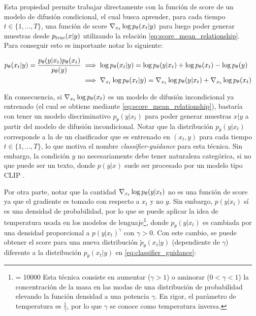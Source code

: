 Esta propiedad permite trabajar directamente con la función de score de un modelo de difusión condicional, el cual busca aprender, para cada tiempo $t\in\{1,\ldots,T\}$, una función de score $\nabla_{x_t} \log p_\theta(x_t|y)$ para luego poder generar muestras desde $p_{\operatorname{true}}(x|y)$ utilizando la relación \eqref{eq:score_mean_relationship}. Para conseguir esto es importante notar lo siguiente:

\begin{align}
    p_\theta(x_t|y) = \frac{p_\theta(y|x_t)p_\theta(x_t)}{p_\theta(y)} &\implies \log p_\theta(x_t|y) = \log p_\theta(y|x_t) + \log p_\theta(x_t) - \log p_\theta(y)\nonumber\\
    &\implies \nabla_{x_t} \log p_\theta(x_t|y) = \nabla_{x_t} \log p_\theta(y|x_t) + \nabla_{x_t} \log p_\theta(x_t)\label{eq:classifier_guidance}
\end{align}

En consecuencia, si $\nabla_{x_t} \log p_\theta(x_t)$ es un modelo de difusión incondicional ya entrenado (el cual se obtiene mediante \eqref{eq:score_mean_relationship}), bastaría con tener un modelo discriminativo $p_\theta(y|x_t)$ para poder generar muestras $x|y$ a partir del modelo de difusión incondicional. Notar que la distribución $p_\theta(y|x_t)$ corresponde a la de un clasificador que es entrenado en $(x_t,y)$ para cada tiempo $t\in\{1,\ldots,T\}$, lo que motiva el nombre \textit{classifier-guidance} para esta técnica. Sin embargo, la condición $y$ no necesariamente debe tener naturaleza categórica, si no que puede ser un texto, donde $p(y|x)$ suele ser procesado por un modelo tipo CLIP \cite{radford2021learningtransferablevisualmodels}.

Por otra parte, notar que la cantidad $\nabla_{x_t} \log p_\theta(y|x_t)$ no es una función de score ya que el gradiente es tomado con respecto a $x_t$ y no $y$. Sin embargo, $p(y|x_t)$ sí es una densidad de probabilidad, por lo que se puede aplicar la idea de temperatura usada en los modelos de lenguaje\footnote{\interlinepenalty = 10000 Esta técnica consiste en aumentar ($\gamma>1$) o aminorar ($0<\gamma<1$) la concentración de la masa en las modas de una distribución de probabilidad elevando la función densidad a una potencia $\gamma$. En rigor, el parámetro de temperatura es $\frac{1}{\gamma}$, por lo que $\gamma$ se conoce como temperatura inversa.}, donde $p_\theta(y|x_t)$ es cambiada por una densidad proporcional a $p(y|x_t)^\gamma$ con $\gamma>0$. Con este cambio, se puede obtener el score para una nueva distribución $\tilde{p}_\theta(x_t|y)$ (dependiente de $\gamma$) diferente a la distribución $p_\theta(x_t|y)$ en \eqref{eq:classifier_guidance}:


